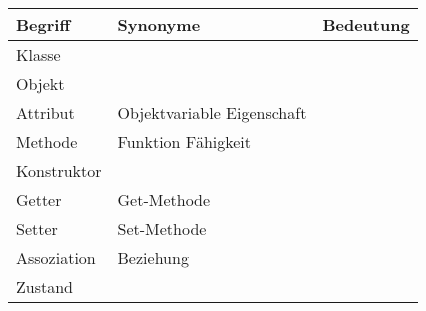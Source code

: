 \documentclass[11pt, a4paper, ngerman]{arbeitsblatt}
\begin{document}
\ReiheTitel

\begin{center}
\begin{longtable}{p{.2\linewidth}|p{.2\linewidth}|p{.5\linewidth}}
	\rowcolor{ab.tabelle.kopf.hg}
	Begriff & Synonyme & Bedeutung \\ \hline \hline

	Klasse & & \Zeilenabstand[2cm] \\\hline
	Objekt & & \Zeilenabstand[2cm] \\\hline
	Attribut & Objektvariable \newline Eigenschaft & \Zeilenabstand[2cm] \\\hline
	Methode & Funktion \newline Fähigkeit & \Zeilenabstand[2cm] \\\hline
	Konstruktor & & \Zeilenabstand[2cm] \\\hline
	Getter & Get-Methode & \Zeilenabstand[2cm] \\\hline
	Setter & Set-Methode & \Zeilenabstand[2cm] \\\hline
	Assoziation & Beziehung & \Zeilenabstand[2cm] \\\hline
	Zustand &  & \Zeilenabstand[2cm] \\\hline
\end{longtable}
\end{center}
\end{document}
